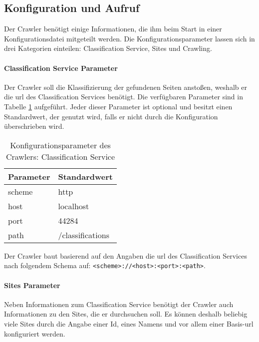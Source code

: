 \subsection{Konfiguration und Aufruf}
    Der Crawler benötigt einige Informationen,
    die ihm beim Start in einer Konfigurationsdatei mitgeteilt werden.
    Die Konfigurationsparameter lassen sich in drei Kategorien einteilen:
    Classification Service, Sites und Crawling.

    \paragraph{Classification Service Parameter}
    Der Crawler soll die Klassifizierung der gefundenen Seiten anstoßen,
    weshalb er die \gls{url} des Classification Services benötigt.
    Die verfügbaren Parameter sind in Tabelle \ref{table:crawlerClassificationServiceParameter} aufgeführt.
    Jeder dieser Parameter ist optional und besitzt einen Standardwert,
    der genutzt wird, falls er nicht durch die Konfiguration überschrieben wird.

    \begin{table}[]
        \centering
        \begin{tabular}{|l|l|}
            \hline
            \textbf{Parameter} & \textbf{Standardwert}\\
            \hline
            scheme & http \\
            \hline
            host & localhost \\
            \hline
            port & 44284 \\
            \hline
            path & /classifications \\
            \hline
            \end{tabular}
        \caption{Konfigurationsparameter des Crawlers: Classification Service}
        \label{table:crawlerClassificationServiceParameter}
    \end{table}

    Der Crawler baut basierend auf den Angaben die \gls{url} des Classification Services nach
    folgendem Schema auf: \texttt{<scheme>://<host>:<port>:<path>}.

    \paragraph{Sites Parameter}
    Neben Informationen zum Classification Service benötigt der Crawler auch Informationen zu den Sites,
    die er durchsuchen soll.
    Es können deshalb beliebig viele Sites durch die Angabe einer Id,
    eines Namens und vor allem einer Basis-\gls{url} konfiguriert werden.

